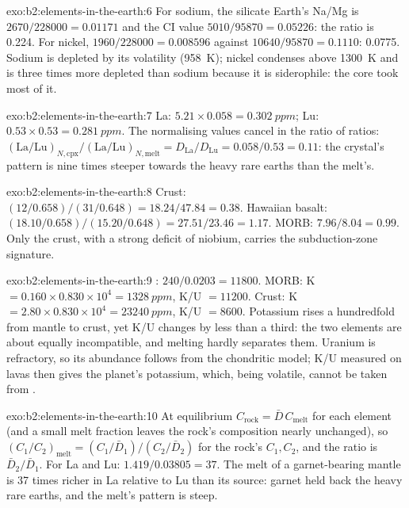 \begin{solution}{exo:b2:elements-in-the-earth:6}
For sodium, the silicate Earth's Na/Mg is $2670/\num{228000} = 0.01171$ and the CI
value $5010/\num{95870} = 0.05226$: the ratio is 0.224. For nickel, $1960/\num{228000}
= 0.008596$ against $\num{10640}/\num{95870} = 0.1110$: 0.0775. Sodium is
depleted by its volatility (\qty{958}{K}); nickel condenses above \qty{1300}{K} and is
three times more depleted than sodium because it is siderophile: the core took most of
it.
\end{solution}

\begin{solution}{exo:b2:elements-in-the-earth:7}
La: $5.21\times0.058 = \qty{0.302}{ppm}$; Lu: $0.53\times0.53 = \qty{0.281}{ppm}$. The
normalising values cancel in the ratio of ratios:
$(\mathrm{La}/\mathrm{Lu})_{N,\mathrm{cpx}}/(\mathrm{La}/\mathrm{Lu})_{N,\mathrm{melt}} =
D_{\mathrm{La}}/D_{\mathrm{Lu}} = 0.058/0.53 = 0.11$: the crystal's pattern is nine
times steeper towards the heavy rare earths than the melt's.
\end{solution}

\begin{solution}{exo:b2:elements-in-the-earth:8}
Crust: $(12/0.658)/(31/0.648) = 18.24/47.84 = 0.38$. Hawaiian basalt:
$(18.10/0.658)/(15.20/0.648) = 27.51/23.46 = 1.17$. MORB: $7.96/8.04 = 0.99$. Only the
crust, with a strong deficit of niobium, carries the subduction-zone signature.
\end{solution}

\begin{solution}{exo:b2:elements-in-the-earth:9}
: $240/0.0203 = \num{11800}$. MORB: K $= 0.160\times0.830\times10^4 =
\qty{1328}{ppm}$, K/U $= \num{11200}$. Crust: K $= 2.80\times0.830\times10^4 =
\qty{23240}{ppm}$, K/U $= \num{8600}$. Potassium rises a hundredfold from mantle to crust,
yet K/U changes by less than a third: the two elements are about equally incompatible,
and melting hardly separates them. Uranium is refractory, so its abundance follows from
the chondritic model; K/U measured on lavas then gives the planet's potassium, which,
being volatile, cannot be taken from .
\end{solution}

\begin{solution}{exo:b2:elements-in-the-earth:10}
At equilibrium $C_{\mathrm{rock}} = \bar D\,C_{\mathrm{melt}}$ for each element (and a
small melt fraction leaves the rock's composition nearly unchanged), so
$(C_1/C_2)_{\mathrm{melt}} = (C_{1}/\bar D_1)/(C_{2}/\bar D_2)$ for the rock's $C_1,
C_2$, and the ratio is $\bar D_2/\bar D_1$. For La and Lu: $1.419/0.03805 = 37$. The melt
of a garnet-bearing mantle is 37 times richer in La relative to Lu than its source: garnet
held back the heavy rare earths, and the melt's pattern is steep.
\end{solution}

